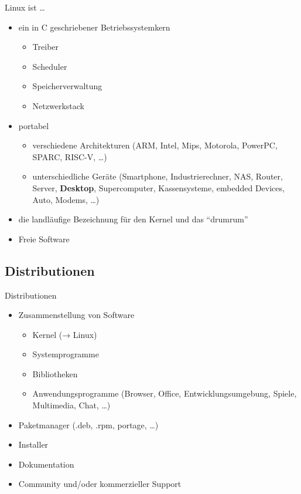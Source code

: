 \documentclass{beamer}
\makeatletter
\newcommand{\strong}[1]{\@strong{#1}}
\newcommand{\@@strong}[1]{\textbf{\let\@strong\@@@strong#1}}
\newcommand{\@@@strong}[1]{\textnormal{\let\@strong\@@strong#1}}
\let\@strong\@@strong
\makeatother
\begin{document}
\begin{frame}{Linux ist …}
    \begin{itemize}
        \item ein in C geschriebener Betriebssystemkern
            \begin{itemize}
                \item Treiber
                \item Scheduler
                \item Speicherverwaltung
                \item Netzwerkstack
            \end{itemize}
        \pause
        \item portabel
            \begin{itemize}
                \item verschiedene Architekturen (ARM, Intel, Mips,
                    Motorola, PowerPC, SPARC, RISC-V, …)
                \item unterschiedliche Geräte (Smartphone,
                    Industrierechner, NAS, Router, Server,
                    \strong{Desktop}, Supercomputer, Kassensysteme,
                    embedded Devices, Auto, Modems, …)
            \end{itemize}
        \pause
        \item die landläufige Bezeichnung für den Kernel und das \enquote{drumrum}
        \pause
        \item Freie Software
    \end{itemize}
\end{frame}

\subsection{Distributionen}

\begin{frame}{Distributionen}
    \begin{itemize}
        \item Zusammenstellung von Software
            \begin{itemize}
                \item Kernel (→ Linux)
                \item Systemprogramme
                \item Bibliotheken
                \item Anwendungsprogramme (Browser, Office,
                    Entwicklungsumgebung, Spiele, Multimedia, Chat, …)
            \end{itemize}
        \pause
        \item Paketmanager (.deb, .rpm, portage, …)
        \pause
        \item Installer
        \item Dokumentation
        \item Community und/oder kommerzieller Support
    \end{itemize}
\end{frame}
\end{document}
